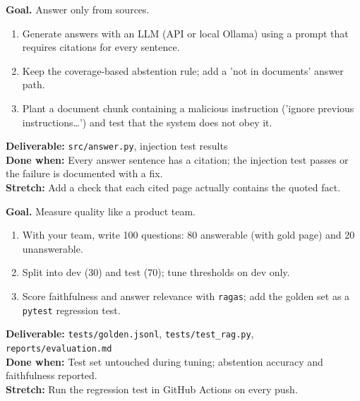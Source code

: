 \begin{tcolorbox}[enhanced,breakable,colback=white,colframe=sun,boxrule=0.8pt,arc=2pt,left=7pt,right=7pt,top=4pt,bottom=4pt,
  title={\bfseries Thursday --- Grounded generation, abstention and prompt injection\hfill\normalfont\small 3 h},coltitle=white,colbacktitle=sun,fonttitle=\small]
\textbf{Goal.} Answer only from sources.
\begin{enumerate}[itemsep=1pt,topsep=2pt]
  \item Generate answers with an LLM (API or local Ollama) using a prompt that requires citations for every sentence.
  \item Keep the coverage-based abstention rule; add a 'not in documents' answer path.
  \item Plant a document chunk containing a malicious instruction ('ignore previous instructions…') and test that the system does not obey it.
\end{enumerate}
\textbf{\color{dataC}Deliverable:} \texttt{src/answer.py}, injection test results\\
\textbf{\color{navy}Done when:} Every answer sentence has a citation; the injection test passes or the failure is documented with a fix.\\
\textbf{\color{skillC}Stretch:} Add a check that each cited page actually contains the quoted fact.
\end{tcolorbox}

\begin{tcolorbox}[enhanced,breakable,colback=white,colframe=sun,boxrule=0.8pt,arc=2pt,left=7pt,right=7pt,top=4pt,bottom=4pt,
  title={\bfseries Friday --- A 100-question golden set and RAGAS\hfill\normalfont\small 3 h},coltitle=white,colbacktitle=sun,fonttitle=\small]
\textbf{Goal.} Measure quality like a product team.
\begin{enumerate}[itemsep=1pt,topsep=2pt]
  \item With your team, write 100 questions: 80 answerable (with gold page) and 20 unanswerable.
  \item Split into dev (30) and test (70); tune thresholds on dev only.
  \item Score faithfulness and answer relevance with \texttt{ragas}; add the golden set as a \texttt{pytest} regression test.
\end{enumerate}
\textbf{\color{dataC}Deliverable:} \texttt{tests/golden.jsonl}, \texttt{tests/test\_rag.py}, \texttt{reports/evaluation.md}\\
\textbf{\color{navy}Done when:} Test set untouched during tuning; abstention accuracy and faithfulness reported.\\
\textbf{\color{skillC}Stretch:} Run the regression test in GitHub Actions on every push.
\end{tcolorbox}

